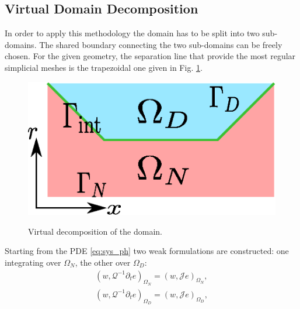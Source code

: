 \documentclass{ifacconf}
\begin{document}
\subsection{Virtual Domain Decomposition}
\label{sec:vdd}
In order to apply this methodology the domain has to be split into two sub-domains. The shared boundary connecting the two sub-domains can be freely chosen. For the given geometry, the separation line that provide the most regular simplicial meshes is the trapezoidal one given in Fig. \ref{fig:dom_dec}. 
\begin{figure}[t]%
	\centering
	\includegraphics[width=0.65\columnwidth]{domain_split.eps} \\
	\caption{Virtual decomposition of the domain.}
	\label{fig:dom_dec}
\end{figure}
Starting from the PDE \eqref{eq:sys_ph} two weak formulations are constructed: one integrating over $\Omega_N$, the other over $\Omega_D$:
\begin{align}
    \left(w, \mathcal{Q}^{-1} \partial_t{e} \right)_{\Omega_N} = \left(w, \mathcal{J} e \right)_{\Omega_{N}} \label{eq: wf_OmN}, \\
    \left(w, \mathcal{Q}^{-1} \partial_t{e} \right)_{\Omega_D} = \left(w, \mathcal{J} e \right)_{\Omega_{D}}, \label{eq: wf_OmD}
\end{align}
\end{document}
